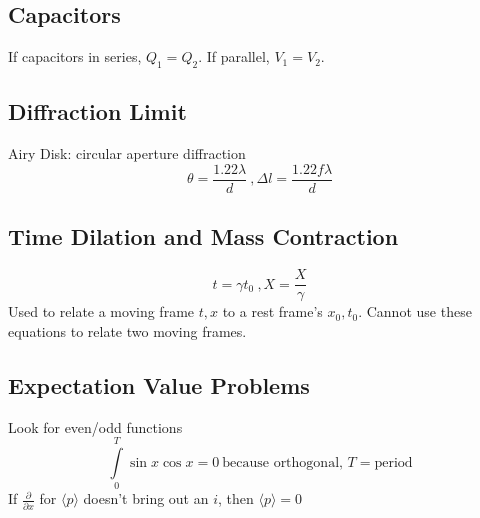 \documentclass[10pt,a4paper]{article}
\begin{document}
\subsection{Capacitors}
If capacitors in series, $Q_1 = Q_2$. If parallel, $V_1 = V_2$.

\subsection{Diffraction Limit}
Airy Disk: circular aperture diffraction
\begin{equation}
 \theta = \frac{1.22 \lambda}{d}~, \Delta l = \frac{1.22 f\lambda}{d}
\end{equation}

\subsection{Time Dilation and Mass Contraction}
\begin{equation}
 t=\gamma t_0~,X = \frac{X}{\gamma} 
\end{equation}
Used to relate a moving frame $t,x$ to a rest frame's $x_0,t_0$. Cannot use these equations to relate two moving frames.

\subsection{Expectation Value Problems}
Look for even/odd functions
\begin{equation}
 \int \limits_0^T \sin x \cos x = 0~ \textrm{because orthogonal, }T= \textrm{period}
\end{equation}
If $\frac{\partial}{\partial x}$ for $ \langle p \rangle$ doesn't bring out an $i$, then $\langle p \rangle = 0$
\end{document}
